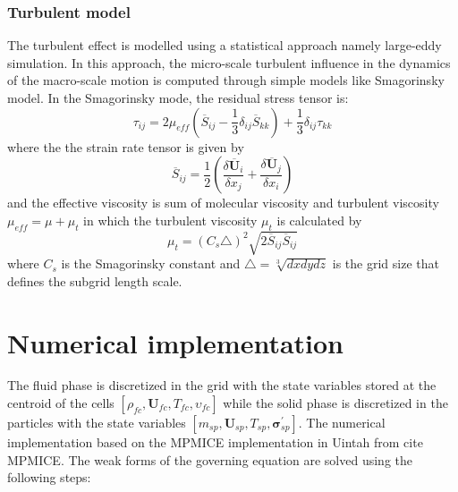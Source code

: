 \documentclass[preprint,12pt]{elsarticle}
\begin{document}
\subsubsection{Turbulent model}
The turbulent effect is modelled using a statistical approach namely large-eddy simulation. In this approach, the micro-scale turbulent influence in the dynamics of the macro-scale motion is computed through simple models like Smagorinsky model. In the Smagorinsky mode, the residual stress tensor is:
%
\begin{equation}
     \tau_{ij} = 2 \mu_{eff} (\overline{S}_{ij} - \frac{1}{3} \delta_{ij} \overline{S}_{kk}) + \frac{1}{3} \delta_{ij} \tau_{kk}
\end{equation}
%
%
where the the strain rate tensor is given by
%
\begin{equation}
     \overline{S}_{ij} = \frac{1}{2} (\frac{\delta \overline{\pmb{U}}_i}{\delta x_j} + \frac{\delta \overline{\pmb{U}}_j}{\delta x_i})
\end{equation}
%
%
and the effective viscosity is sum of molecular viscosity and turbulent viscosity $\mu_{eff} = \mu + \mu_t$ in which the turbulent viscosity $\mu_t$ is calculated by
%
\begin{equation}
    \mu_t = (C_s \triangle)^2 \sqrt{2 \overline{S}_{ij} \overline{S}_{ij}}
\end{equation}
%
%
where $C_s$ is the Smagorinsky constant and $\triangle = \sqrt[3]{dx dy dz}$ is the grid size that defines the subgrid length scale. 
%
\section{\textsf{Numerical implementation}}
\label{Discretization}
The fluid phase is discretized in the grid with the state variables stored at the centroid of the cells $[\rho_{fc},\pmb{U}_{fc},T_{fc},\upsilon_{fc}]$ while the solid phase is discretized in the particles with the state variables $[m_{sp},\pmb{U}_{sp},T_{sp},\pmb{\sigma}^\prime_{sp}]$. The numerical implementation based on the MPMICE implementation in Uintah from cite MPMICE. The weak forms of the governing equation are solved using the following steps:\\
%
%
\end{document}
